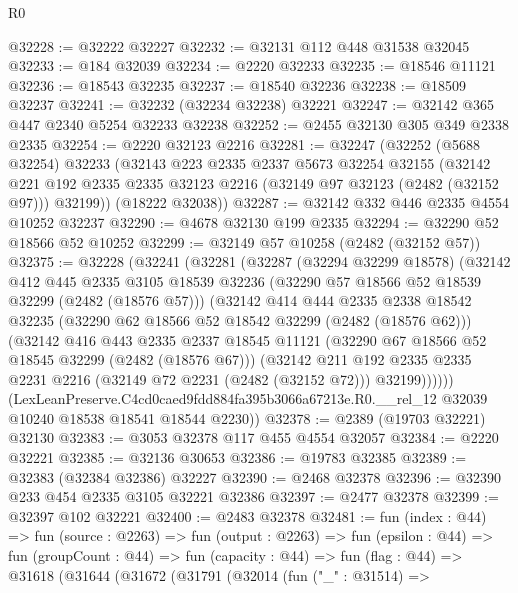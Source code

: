 \begin{lexlean}{R0}
\begin{coremodule}
@32228 := @32222 @32227
@32232 := @32131 @112 @448 @31538 @32045
@32233 := @184 @32039
@32234 := @2220 @32233
@32235 := @18546 @11121
@32236 := @18543 @32235
@32237 := @18540 @32236
@32238 := @18509 @32237
@32241 := @32232 (@32234 @32238) @32221
@32247 := @32142 @365 @447 @2340 @5254 @32233 @32238
@32252 := @2455 @32130 @305 @349 @2338 @2335
@32254 := @2220 @32123 @2216
@32281 := @32247
    (@32252
      (@5688 @32254)
      @32233
      (@32143
        @223
        @2335
        @2337
        @5673
        @32254
        @32155
        (@32142 @221 @192 @2335 @2335 @32123 @2216 (@32149 @97 @32123 (@2482 (@32152 @97))) @32199))
      (@18222 @32038))
@32287 := @32142 @332 @446 @2335 @4554 @10252 @32237
@32290 := @4678 @32130 @199 @2335
@32294 := @32290 @52 @18566 @52 @10252
@32299 := @32149 @57 @10258 (@2482 (@32152 @57))
@32375 := @32228
    (@32241
      (@32281
        (@32287
          (@32294 @32299 @18578)
          (@32142
            @412
            @445
            @2335
            @3105
            @18539
            @32236
            (@32290 @57 @18566 @52 @18539 @32299 (@2482 (@18576 @57)))
            (@32142
              @414
              @444
              @2335
              @2338
              @18542
              @32235
              (@32290 @62 @18566 @52 @18542 @32299 (@2482 (@18576 @62)))
              (@32142
                @416
                @443
                @2335
                @2337
                @18545
                @11121
                (@32290 @67 @18566 @52 @18545 @32299 (@2482 (@18576 @67)))
                (@32142
                  @211
                  @192
                  @2335
                  @2335
                  @2231
                  @2216
                  (@32149 @72 @2231 (@2482 (@32152 @72)))
                  @32199))))))
      (LexLeanPreserve.C4cd0caed9fdd884fa395b3066a67213e.R0.__rel_12
        @32039
        @10240
        @18538
        @18541
        @18544
        @2230))
@32378 := @2389 (@19703 @32221) @32130
@32383 := @3053 @32378 @117 @455 @4554 @32057
@32384 := @2220 @32221
@32385 := @32136 @30653
@32386 := @19783 @32385
@32389 := @32383 (@32384 @32386) @32227
@32390 := @2468 @32378
@32396 := @32390 @233 @454 @2335 @3105 @32221 @32386
@32397 := @2477 @32378
@32399 := @32397 @102 @32221
@32400 := @2483 @32378
@32481 := fun (index : @44) =>
  fun (source : @2263) =>
  fun (output : @2263) =>
  fun (epsilon : @44) =>
  fun (groupCount : @44) =>
  fun (capacity : @44) =>
  fun (flag : @44) =>
  @31618
    (@31644
      (@31672
        (@31791
          (@32014
            (fun ("_" : @31514) =>

\end{coremodule}
\end{lexlean}
